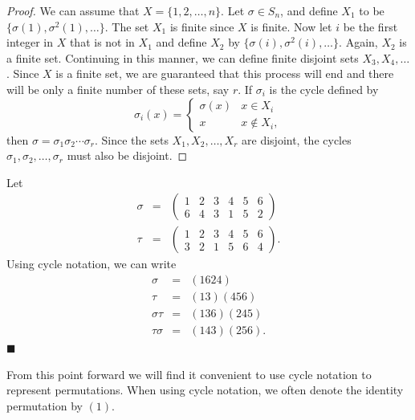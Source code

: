  
 
\begin{proof}
We can assume that $X = \{ 1, 2, \ldots, n \}$. Let $\sigma \in S_n$,
and define $X_1$ to be $\{ \sigma(1), \sigma^2(1), \ldots \}$. The set
$X_1$ is finite since $X$ is finite. Now let $i$ be the first integer
in $X$ that is not in $X_1$ and define $X_2$ by $\{ \sigma(i),
\sigma^2(i), \ldots \}$. Again, $X_2$ is a finite set.  Continuing in
this manner, we can define finite disjoint sets $X_3, X_4, \ldots$.
Since $X$ is a finite set, we are guaranteed that this process will
end and there will be only a finite number of these sets, say $r$. If
$\sigma_i$ is the cycle defined by 
$$
\sigma_i( x )
= \left\{
\begin{array}{ll}
\sigma( x ) & x \in X_i \\
x & x \notin X_i,
\end{array}
\right.
$$
then $\sigma = \sigma_1 \sigma_2 \cdots \sigma_r$. Since the sets
$X_1, X_2, \ldots, X_r$ are disjoint, the cycles $\sigma_1, \sigma_2,
\ldots, \sigma_r$ must also be disjoint.
\end{proof}
 
 
\vspace{2ex}
 
 
Let
\begin{eqnarray*}
\sigma & = &
\left(
\begin{array}{cccccc}
1 & 2 & 3 & 4 & 5 & 6 \\
6 & 4 & 3 & 1 & 5 & 2
\end{array}
\right) \\
\tau & = &
\left(
\begin{array}{cccccc}
1 & 2 & 3 & 4 & 5 & 6 \\
3 & 2 & 1 & 5 & 6 & 4
\end{array}
\right).
\end{eqnarray*}
Using cycle notation, we can write
\begin{eqnarray*}
\sigma & = & (1624) \\
\tau & = & (13)(456) \\
\sigma \tau & = &  (1 3 6) ( 2 4 5) \\
\tau \sigma  & = & (1 4 3 )(2 5 6). 
\end{eqnarray*}
\hspace{\fill} $\blacksquare$
 
 
\vspace{2ex}
 
 
From this point forward we will find it convenient to use cycle
notation to represent permutations. 
When using cycle notation, we often denote the identity permutation
by $(1)$.
 

